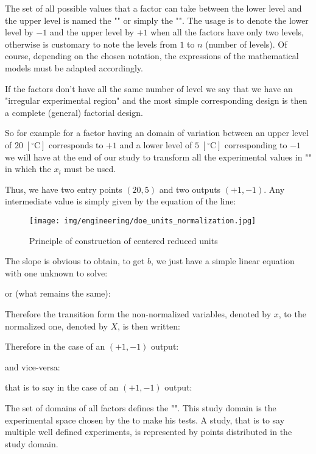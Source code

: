 	The set of all possible values that a factor can take between the lower level and the upper level is named the "" or simply the "". The usage is to denote the lower level by $-1$ and the upper level by $+1$ when all the factors have only two levels, otherwise is customary to note the levels from $1$ to $n$ (number of levels). Of course, depending on the chosen notation, the expressions of the mathematical models must be adapted accordingly.
	\begin{tcolorbox}[title=Remark,colframe=black,arc=10pt]
	If the factors don't have all the same number of level we say that we have an "irregular experimental region" and the most simple corresponding design is then a complete (general) factorial design.
	\end{tcolorbox}
	So for example for a factor having an domain of variation between an upper level of $20\; [^{\circ}\text{C}]$ corresponds to $+1$ and a lower level of $5\; [^{\circ}\text{C}]$ corresponding to $-1$ we will have at the end of our study to transform all the experimental values in "" in which the $x_i$ must be used.

	Thus, we have two entry points $(20,5)$ and two outputs $(+1, -1)$. Any intermediate value is simply given by the equation of the line:
	\begin{figure}[H]
		\begin{center}
		\texttt{[image: img/engineering/doe\_units\_normalization.jpg]}
		\end{center}	
		\caption{Principle of construction of centered reduced units}
	\end{figure}
	The slope is obvious to obtain, to get $b$, we just have a simple linear equation with one unknown to solve:
	
	or (what remains the same):
	
	Therefore the transition form the non-normalized variables, denoted by $x$, to the normalized one, denoted by $X$, is then written:
	
	Therefore in the case of an $(+1,-1)$ output:
	
	and vice-versa:
	
	that is to say in the case of an $(+1,-1)$ output:
	
	The set of domains of all factors defines the "". This study domain is the experimental space chosen by the  to make his tests. A study, that is to say multiple well defined experiments, is represented by points distributed in the study domain.

